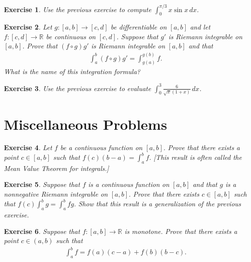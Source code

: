 \documentclass[12pt]{article}
\newcommand{\bR}{\mathbb{R}}
\newcommand{\ra}{\rightarrow}
\theoremstyle{plain}
\newtheorem{exer}{\textbf{Exercise}}}
\theoremstyle{plain}
\theoremstyle{plain}
\theoremstyle{plain}
\begin{document}
\begin{exer}
Use the previous exercise to compute $\int_0^{\pi/3} x \sin x \, dx$.
\end{exer}

\begin{exer}
Let $g : [a, b] \ra [c, d]$ be differentiable on $[a, b]$ and let $f : [c, d] \ra \bR$ be continuous on $[c, d]$. Suppose that $g'$ is Riemann integrable on $[a, b]$. Prove that $(f \circ g)g'$ is Riemann integrable on $[a, b]$ and that
	\begin{align*}
	\int_a^b (f \circ g) g' = \int_{g(a)}^{g(b)} f .
	\end{align*}
What is the name of this integration formula?
\end{exer}

\begin{exer}
Use the previous exercise to evaluate $\int_0^3 \frac{6}{\sqrt{x} (1 + x)} \, dx$.
\end{exer}

\section*{Miscellaneous Problems}

\begin{exer}
Let $f$ be a continuous function on $[a, b]$. Prove that there exists a point $c \in [a, b]$ such that $f(c) (b - a) = \int_a^b f$. [This result is often called the Mean Value Theorem for integrals.]
\end{exer}

\begin{exer}
Suppose that $f$ is a continuous function on $[a, b]$ and that $g$ is a nonnegative Riemann integrable on $[a, b]$. Prove that there exists $c \in [a, b]$ such that $f(c) \int_a^b g = \int_a^b fg$. Show that this result is a generalization of the previous exercise.
\end{exer}

\begin{exer}
Suppose that $f : [a, b] \ra \bR$ is monotone. Prove that there exists a point $c \in (a, b)$ such that
	\begin{align*}
	\int_a^b f = f(a) (c - a) + f(b) (b - c) .
	\end{align*}
\end{exer}
\end{document}
